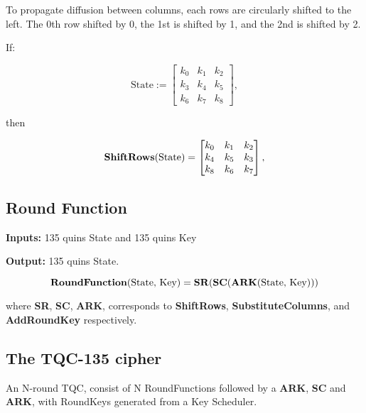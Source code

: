 \documentclass{article}
\begin{document}
\medskip

To propagate diffusion between columns, each rows are circularly
shifted to the left. The 0th row shifted by 0, the 1st is shifted by 1,
and the 2nd is shifted by 2.

If:

\[
\textrm{State} := 
\begin{bmatrix}
k_0 & k_1 & k_2 \\
k_3 & k_4 & k_5 \\
k_6 & k_7 & k_8
\end{bmatrix},
\]

then

\[
\textrm{\textbf{ShiftRows}(State)} =
\begin{bmatrix}
k_0 & k_1 & k_2 \\
k_4 & k_5 & k_3 \\
k_8 & k_6 & k_7
\end{bmatrix},
\]

\subsection{Round Function}

\textbf{Inputs:} 135 quins State and 135 quins Key

\noindent \textbf{Output:} 135 quins State.

\[
  \textrm{\textbf{RoundFunction}(State, Key)} = \textrm{\textbf{SR}(\textbf{SC}(\textbf{ARK}(State, Key)))}
\]

where \textbf{SR}, \textbf{SC}, \textbf{ARK}, corresponds to \textbf{ShiftRows}, \textbf{SubstituteColumns}, and \textbf{AddRoundKey} respectively.

\subsection{The TQC-135 cipher}

An N-round TQC, consist of N RoundFunctions followed by a \textbf{ARK}, \textbf{SC} and \textbf{ARK},
with RoundKeys generated from a Key Scheduler.
\end{document}

